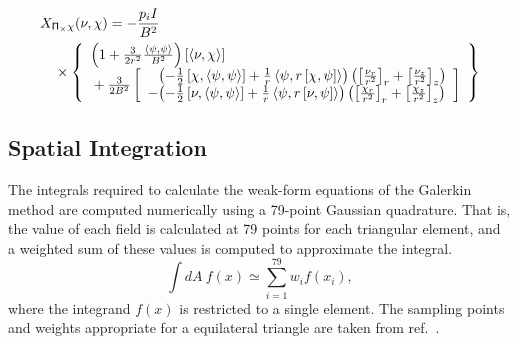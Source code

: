 \documentclass[letterpaper]{book}
\newcommand{\tensor}[1]{\mathsf{#1}}
\renewcommand{\P}{\tensor{\Pi}}
\newcommand{\pb}[2]{\left[#1,#2\right]}
\newcommand{\ip}[2]{\left\langle  #1,#2\right\rangle}
\newcommand{\funcsa}[2]{\left[\left\langle #1,#2 \right\rangle\right]}
\begin{document}
\begin{eqnarray*}
  & \lefteqn{X_{\P_\times \chi}(\nu, \chi) = -\frac{p_i I}{B^2}} &
  \\ && \mbox{} \times 
  \left\{ \begin{array}{l}
    \left(1 + \frac{3}{2 r^2} \frac{\ip{\psi}{\psi}}{B^2} \right)
    \funcsa{\nu}{\chi}
    \\ \mbox{} + \frac{3}{2 B^2} \left[ \begin{array}{r@{}l}
      & \left(- \frac{1}{2} \pb{\chi}{\ip{\psi}{\psi}}
	      + \frac{1}{r} \ip{\psi}{r\pb{\chi}{\psi}} 
             \right)
	\left( \left[ \frac{\nu_r}{r^2} \right]_r
	     + \left[ \frac{\nu_z}{r^2} \right]_z \right)
    \\ \mbox{}
     - & \left(- \frac{1}{2} \pb{\nu}{\ip{\psi}{\psi}}
               + \frac{1}{r} \ip{\psi}{r\pb{\nu}{\psi}} 
              \right)
         \left( \left[ \frac{\chi_r}{r^2} \right]_r
	      + \left[ \frac{\chi_z}{r^2} \right]_z \right)
      \end{array} \right]
  \end{array} \right\}
\end{eqnarray*}

\subsection{Spatial Integration}

The integrals required to calculate the weak-form equations of the
Galerkin method are computed numerically using a 79-point Gaussian
quadrature.  That is, the value of each field is calculated at 79
points for each triangular element, and a weighted sum of these values
is computed to approximate the integral.
\[
  \int dA\ f(x) \simeq \sum_{i=1}^{79} w_i f(x_i),
\]
where the integrand $f(x)$ is restricted to a single element.  The
sampling points and weights appropriate for a equilateral triangle are
taken from ref.~\cite{Dunavant85}.
\end{document}
